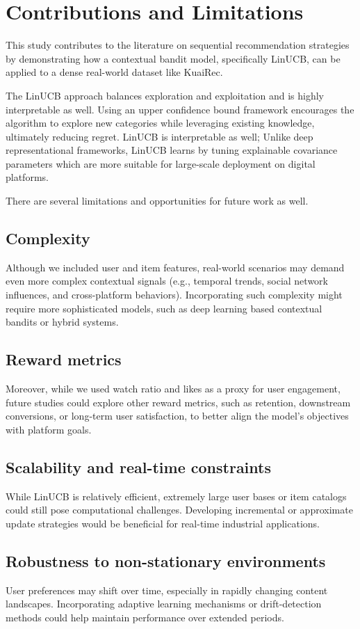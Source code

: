 \section{Contributions and Limitations}

This study contributes to the literature on sequential recommendation strategies by demonstrating how a contextual bandit model, specifically LinUCB, can be applied to a dense real-world dataset like KuaiRec. 

The LinUCB approach balances exploration and exploitation and is highly interpretable as well. Using an upper confidence bound framework encourages the algorithm to explore new categories while leveraging existing knowledge, ultimately reducing regret. LinUCB is interpretable as well; Unlike deep representational frameworks, LinUCB learns by tuning explainable covariance parameters which are more suitable for large-scale deployment on digital platforms.

There are several limitations and opportunities for future work as well.

\subsection{Complexity}

Although we included user and item features, real-world scenarios may demand even more complex contextual signals (e.g., temporal trends, social network influences, and cross-platform behaviors). Incorporating such complexity might require more sophisticated models, such as deep learning based contextual bandits or hybrid systems.

\subsection{Reward metrics}

Moreover, while we used watch ratio and likes as a proxy for user engagement, future studies could explore other reward metrics, such as retention, downstream conversions, or long-term user satisfaction, to better align the model’s objectives with platform goals.

\subsection{Scalability and real-time constraints}

While LinUCB is relatively efficient, extremely large user bases or item catalogs could still pose computational challenges. Developing incremental or approximate update strategies would be beneficial for real-time industrial applications.
    
\subsection{Robustness to non-stationary environments}

User preferences may shift over time, especially in rapidly changing content landscapes. Incorporating adaptive learning mechanisms or drift-detection methods could help maintain performance over extended periods.
